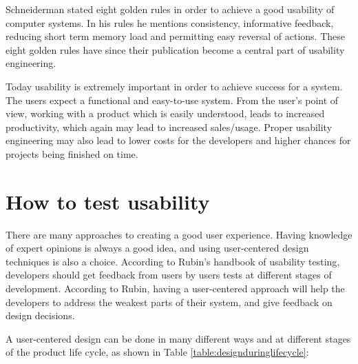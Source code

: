 Schneiderman stated eight golden rules in order to achieve a good usability of computer systems\cite{shneiderman2003designing}. In his rules he mentions consistency, informative feedback, reducing short term memory load and permitting easy reversal of actions. These eight golden rules have since their publication become a central part of usability engineering.

Today usability is extremely important in order to achieve success for a system. The users expect a functional and easy-to-use system. From the user's point of view, working with a product which is easily understood, leads to increased productivity, which again may lead to increased sales/usage\cite{folmer2004architecting}. Proper usability engineering may also lead to lower costs for the developers and higher chances for projects being finished on time\cite{nielsen1994usability}. 


\section{How to test usability}
\label{sec:howtotestusability}
There are many approaches to creating a good user experience. Having knowledge of expert opinions is always a good idea, and using user-centered design techniques is also a choice. According to Rubin's handbook of usability testing\cite{rubin2008handbook}, developers should get feedback from users by users tests at different stages of development. According to Rubin, having a user-centered approach will help the developers to address the weakest parts of their system, and give feedback on design decisions. 

A user-centered design can be done in many different ways and at different stages of the product life cycle\cite{abrasusercentereddesign}, as shown in Table \ref{table:designduringlifecycle}:

